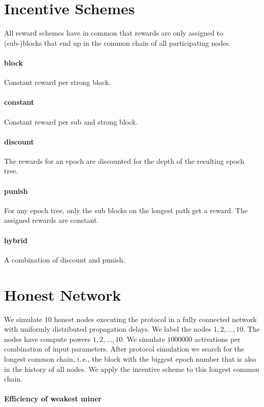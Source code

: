 \documentclass{article}
\begin{document}
\section{Incentive Schemes}

All reward schemes have in common that rewards are only assigned to (sub-)blocks that end up in the common chain of all participating nodes.

\paragraph{block}
Constant reward per strong block.

\paragraph{constant}
Constant reward per sub and strong block.

\paragraph{discount}
The rewards for an epoch are discounted for the depth of the resulting epoch tree.

\paragraph{punish}
For any epoch tree, only the sub blocks on the longest path get a reward. The assigned rewards are constant.

\paragraph{hybrid}
A combination of discount and punish.

\section{Honest Network}

We simulate 10 honest nodes executing the protocol in a fully connected network with uniformly distributed propagation delays.
We label the nodes $1, 2, \dots, 10$. The nodes have compute powers $1, 2, \dots, 10$.
We simulate $1 000 000$ activations per combination of input parameters.
After protocol simulation we search for the longest common chain, i.\,e., the block with the biggest epoch number that is also in the history of all nodes.
We apply the incentive scheme to this longest common chain.

\paragraph{Efficiency of weakest miner}
\end{document}
